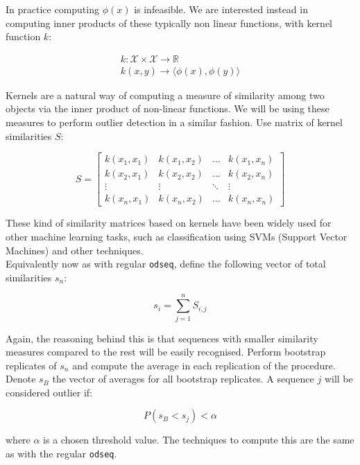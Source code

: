 \documentclass[a4paper]{llncs}
\begin{document}
In practice computing $\phi(x)$ is infeasible. We are interested instead in computing inner products of these typically non linear functions, with kernel function $k$:

\begin{gather}
k: \mathcal{X}\times \mathcal{X} \rightarrow \mathbb{R}\\
k(x,y) \rightarrow \langle\phi(x), \phi(y) \rangle
\end{gather}

Kernels are a natural way of computing a measure of similarity among two objects via the inner product of non-linear functions. We will be using these measures to perform outlier detection in a similar fashion. Use matrix of kernel similarities $S$:

\begin{equation}
S=
  \begin{bmatrix}
    k(x_1,x_1) & k(x_1,x_2) & \dots & k(x_1,x_n)\\
    k(x_2,x_1) & k(x_2,x_2) & \dots & k(x_2,x_n)\\
    \vdots & \vdots & \ddots & \vdots\\
    k(x_n,x_1) & k(x_n,x_2) & \dots & k(x_n,x_n)
  \end{bmatrix}
\end{equation}

These kind of similarity matrices based on kernels have been widely used for other machine learning tasks, such as classification using SVMs (Support Vector Machines) and other techniques.\\

Equivalently now as with regular \texttt{odseq}, define the following vector of total similarities $s_n$:

\begin{equation}
s_i = \sum_{j=1}^n S_{i,j}
\end{equation}

Again, the reasoning behind this is that sequences with smaller similarity measures compared to the rest will be easily recognised. Perform bootstrap replicates of $s_n$ and compute the average in each replication of the procedure. Denote $s_B$ the vector of averages for all bootstrap replicates. A sequence $j$ will be considered outlier if:

\begin{equation}
P(s_B < s_j) < \alpha
\end{equation}

where $\alpha$ is a chosen threshold value. The techniques to compute this are the same as with the regular \texttt{odseq}.
\end{document}
